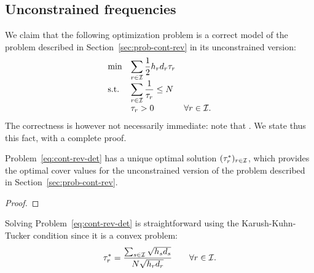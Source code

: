 
\subsection{Unconstrained frequencies}



We claim that the following optimization problem is a correct model of the problem described in Section~\ref{sec:prob-cont-rev} in its unconstrained version:
\begin{equation}\label{eq:cont-rev-det}
  \begin{array}{lll}
  \min & \displaystyle\sum_{r\in\mathcal{I}} \frac{1}{2}h_rd_r\tau_r \\
  \text{s.t.}  & \displaystyle\sum_{r\in\mathcal{I}} \frac{1}{\tau_r} \le N \\
       & \tau_r > 0 & \forall r\in\mathcal{I}.
  \end{array}
\end{equation}
The correctness is however not necessarily immediate: note that \tbc. We state thus this fact, with a complete proof.


\begin{prop}
Problem~\eqref{eq:cont-rev-det} has a unique optimal solution $(\tau_r^*)_{r\in\mathcal{I}}$, which provides the optimal cover values for the unconstrained version of the problem described in Section~\ref{sec:prob-cont-rev}.
\end{prop}

\begin{proof}
\tbc
\end{proof}

Solving Problem~\eqref{eq:cont-rev-det} is straightforward using the Karush-Kuhn-Tucker condition since it is a convex problem:
$$\tau_r^*= \frac{\sum_{s\in\mathcal{I}}\sqrt{h_sd_s}}{N\sqrt{h_rd_r}}\qquad\forall r\in\mathcal{I}.$$



